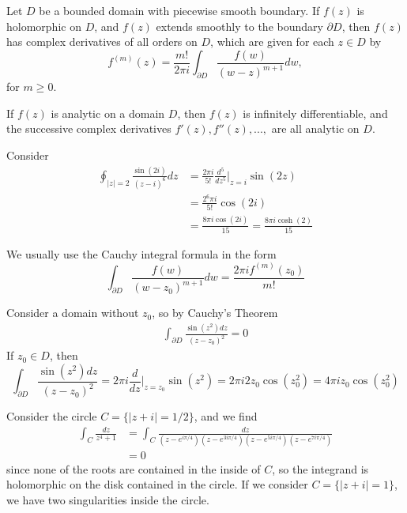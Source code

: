 \documentclass[12pt, a4paper, oneside, openright, titlepage]{book}
\begin{document}
\begin{namthm}
    Let $D$ be a bounded domain with piecewise smooth boundary. If $f(z)$ is holomorphic on $D$, and $f(z)$ extends smoothly to the boundary $\partial D$, then $f(z)$ has complex derivatives of all orders on $D$, which are given for each $z \in D$ by \begin{equation*}
        f^{(m)}(z) = \frac{m!}{2\pi i}\int_{\partial D}\frac{f(w)}{(w-z)^{m+1}}dw,
    \end{equation*}
    for $m \geq 0$.
\end{namthm}

\begin{cor}
    If $f(z)$ is analytic on a domain $D$, then $f(z)$ is infinitely differentiable, and the successive complex derivatives $f'(z),f''(z),...,$ are all analytic on $D$.
\end{cor}


\begin{eg}
    Consider \begin{align*}
        \oint_{|z| = 2}\frac{\sin(2i)}{(z-i)^6}dz &= \frac{2\pi i}{5!}\frac{d^5}{dz^5}\Bigg\rvert_{z=i}\sin(2z) \\
        &= \frac{2^6\pi i}{5!}\cos(2i) \\
        &= \frac{8\pi i\cos(2i)}{15} = \frac{8\pi i\cosh(2)}{15}
    \end{align*}
\end{eg}


We usually use the Cauchy integral formula in the form \begin{equation*}
    \int_{\partial D}\frac{f(w)}{(w-z_0)^{m+1}}dw = \frac{2\pi if^{(m)}(z_0)}{m!}
\end{equation*}

\begin{eg}
    Consider a domain without $z_0$, so by Cauchy's Theorem \begin{align*}
        \int_{\partial D}\frac{\sin(z^2)dz}{(z-z_0)^2} = 0 
    \end{align*}
    If $z_0 \in D$, then \begin{equation*}
        \int_{\partial D}\frac{\sin(z^2)dz}{(z-z_0)^2} = 2\pi i\frac{d}{dz}\Bigg\rvert_{z=z_0}\sin(z^2) = 2\pi i2z_0\cos(z_0^2) = 4\pi iz_0\cos(z_0^2)
    \end{equation*}
\end{eg}


\begin{eg}
    Consider the circle $C= \{|z+i| = 1/2\}$, and we find \begin{align*}
        \int_C\frac{dz}{z^4+1} &= \int_C\frac{dz}{(z-e^{i\pi/4})(z-e^{3i\pi/4})(z-e^{5i\pi/4})(z-e^{7i\pi/4})} \\
        &= 0
    \end{align*}
    since none of the roots are contained in the inside of $C$, so the integrand is holomorphic on the disk contained in the circle. If we consider $C= \{|z+i| = 1\}$, we have two singularities inside the circle. 
\end{eg}
\end{document}
